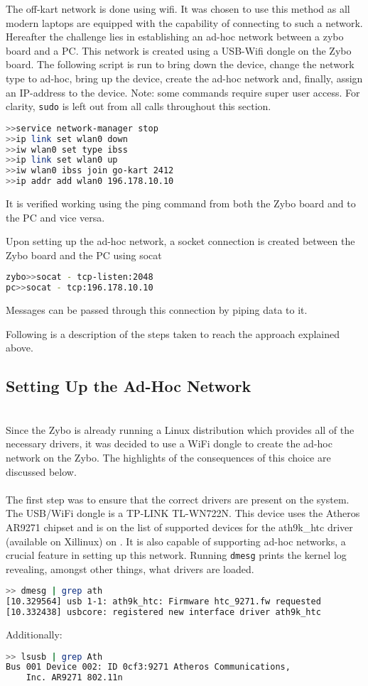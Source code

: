 The off-kart network is done using wifi.
It was chosen to use this method as all modern laptops are equipped with the capability of connecting to such a network.
Hereafter the challenge lies in establishing an ad-hoc network between a zybo board and a PC.
This network is created using a USB-Wifi dongle on the Zybo board. 
The following script is run to bring down the device, change the network type to ad-hoc, bring up the device, create the ad-hoc network and, finally, assign an IP-address to the device.
Note: some commands require super user access.
For clarity, \texttt{sudo} is left out from all calls throughout this section.

\begin{lstlisting}[language=bash]
>>service network-manager stop
>>ip link set wlan0 down
>>iw wlan0 set type ibss
>>ip link set wlan0 up
>>iw wlan0 ibss join go-kart 2412
>>ip addr add wlan0 196.178.10.10
\end{lstlisting}
It is verified working using the ping command from both the Zybo board and to the PC and vice versa.

Upon setting up the ad-hoc network, a socket connection is created between the Zybo board and the PC using socat
\begin{lstlisting}[language=bash]
zybo>>socat - tcp-listen:2048
pc>>socat - tcp:196.178.10.10
\end{lstlisting}

Messages can be passed through this connection by piping data to it.

Following is a description of the steps taken to reach the approach explained above.
\subsection{Setting Up the Ad-Hoc Network}~\\
Since the Zybo is already running a Linux distribution which provides all of the necessary drivers, it was decided to use a WiFi dongle to create the ad-hoc network on the Zybo.
The highlights of the consequences of this choice are discussed below.
\\~\\
The first step was to ensure that the correct drivers are present on the system.
The USB/WiFi dongle is a TP-LINK TL-WN722N.
This device uses the Atheros AR9271 chipset and is on the list of supported devices for the ath9k\_htc driver (available on Xillinux) on \cite{ath9k}.
It is also capable of supporting ad-hoc networks, a crucial feature in setting up this network.
Running \texttt{dmesg} prints the kernel log revealing, amongst other things, what drivers are loaded.
\begin{lstlisting}[language=bash]
>> dmesg | grep ath
[10.329564] usb 1-1: ath9k_htc: Firmware htc_9271.fw requested
[10.332438] usbcore: registered new interface driver ath9k_htc
\end{lstlisting}
Additionally:
\begin{lstlisting}[language=bash]
>> lsusb | grep Ath
Bus 001 Device 002: ID 0cf3:9271 Atheros Communications, 
	Inc. AR9271 802.11n
\end{lstlisting}

